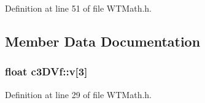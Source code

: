 Definition at line 51 of file WTMath.h.



\subsection{Member Data Documentation}
\hypertarget{classc3_d_vf_a1829a0b394e0483bf61450457b7517a4}{
\subsubsection[{v}]{\setlength{\rightskip}{0pt plus 5cm}float {\bf c3DVf::v}\mbox{[}3\mbox{]}}}
\label{classc3_d_vf_a1829a0b394e0483bf61450457b7517a4}


Definition at line 29 of file WTMath.h.

